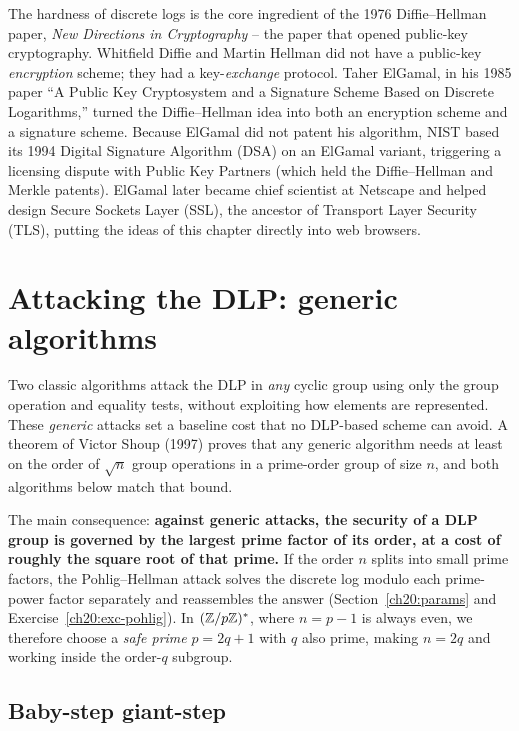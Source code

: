 \begin{historybox}
The hardness of discrete logs is the core ingredient of the 1976 Diffie--Hellman paper, \emph{New Directions in Cryptography} -- the paper that opened public-key cryptography. Whitfield Diffie and Martin Hellman did not have a public-key \emph{encryption} scheme; they had a key-\emph{exchange} protocol. Taher ElGamal, in his 1985 paper ``A Public Key Cryptosystem and a Signature Scheme Based on Discrete Logarithms,'' turned the Diffie--Hellman idea into both an encryption scheme and a signature scheme. Because ElGamal did not patent his algorithm, NIST based its 1994 Digital Signature Algorithm (DSA) on an ElGamal variant, triggering a licensing dispute with Public Key Partners (which held the Diffie--Hellman and Merkle patents). ElGamal later became chief scientist at Netscape and helped design Secure Sockets Layer (SSL), the ancestor of Transport Layer Security (TLS), putting the ideas of this chapter directly into web browsers.
\end{historybox}

\section{Attacking the DLP: generic algorithms}
\label{ch20:generic}

Two classic algorithms attack the DLP in \emph{any}
cyclic group using only the group operation and equality tests, without exploiting how elements are represented.
These \emph{generic} attacks set a baseline cost that no DLP-based scheme can avoid. A theorem of Victor Shoup (1997) proves that any generic algorithm needs at least on the order of $\sqrt{n}$ group
operations in a prime-order group of size $n$, and both algorithms below match that bound.

The main consequence: \textbf{against generic attacks, the security of a DLP group is governed by the largest prime factor
of its order, at a cost of roughly the square root of that prime.} If the order $n$ splits into small prime factors, the Pohlig--Hellman attack solves the discrete log modulo each prime-power factor separately and reassembles the answer (Section~\ref{ch20:params} and Exercise~\ref{ch20:exc-pohlig}). In $(\mathbb{Z}/p\mathbb{Z})^{*}$, where $n = p - 1$ is always even, we therefore choose a \emph{safe prime} $p = 2q + 1$ with $q$ also prime, making $n = 2q$ and working inside the order-$q$ subgroup.

\subsection{Baby-step giant-step}

